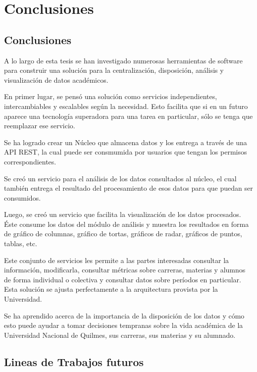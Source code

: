 \chapter{Conclusiones}
\label{sec:conclusiones}

\section[Conclusiones]{Conclusiones}

A lo largo de esta tesis se han investigado numerosas herramientas de software para construir una solución para la centralización, disposición, análisis y visualización de datos académicos.

En primer lugar, se pensó una solución como servicios independientes, intercambiables y escalables según la necesidad. Esto facilita que si en un futuro aparece una tecnología superadora para una tarea en particular, sólo se tenga que reemplazar ese servicio.

Se ha logrado crear un Núcleo que almacena datos y los entrega a través de una API REST, la cual puede ser consmumida por usuarios que tengan los permisos correspondientes.

Se creó un servicio para el análisis de los datos consultados al núcleo, el cual también entrega el resultado del procesamiento de esos datos para que puedan ser consumidos.

Luego, se creó un servicio que facilita la visualización de los datos procesados. Éste consume los datos del módulo de análisis y muestra los resultados en forma de gráfico de columnas, gráfico de tortas, gráficos de radar, gráficos de puntos, tablas, etc.

Este conjunto de servicios les permite a las partes interesadas consultar la información, modificarla, consultar métricas sobre carreras, materias y alumnos de forma individual o colectiva y consultar datos sobre períodos en particular.
Esta solución se ajusta perfectamente a la arquitectura provista por la Universidad.

Se ha aprendido acerca de la importancia de la disposición de los datos y cómo esto puede ayudar a tomar decisiones tempranas sobre la vida académica de la Universidad Nacional de Quilmes, sus carreras, sus materias y su alumnado.


\section[Lineas de Trabajos futuros]{Lineas de Trabajos futuros}

